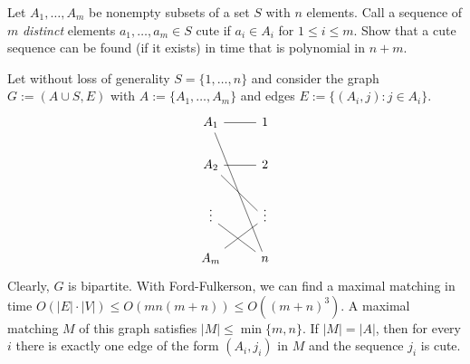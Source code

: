 \documentclass{article}
\begin{document}
\newpage
\begin{exercise}
    Let $A_1,\dots, A_m$ be nonempty subsets of a set $S$ with $n$ elements. Call a sequence of $m$ \textit{distinct} elements $a_1,\dots, a_m\in S$ cute if $a_i\in A_i$ for $1\leq i\leq m$. Show that a cute sequence can be found (if it exists) in time that is polynomial in $n+m$.
\end{exercise}
\begin{solving}
Let without loss of generality $S = \{1, \dots, n\}$ and consider the graph $G:= (A\cup S, E)$ with $A := \{A_1, \dots, A_m\}$ and edges $E:= \{(A_i, j): j\in A_i\}$. \begin{equation*}
    \begin{tikzcd}
        A_1\arrow[r, no head]\arrow[rddd, no head]& 1\\
        A_2\arrow[r, no head]\arrow[rd, no head]& 2 \\
        \vdots\arrow[rd, no head] & \vdots\\
        A_m \arrow[ru, no head] & n
    \end{tikzcd}
\end{equation*}
Clearly, $G$ is bipartite. With Ford-Fulkerson, we can find a maximal matching in time $O(|E|\cdot|V|)\leq O(mn(m+n)) \leq O((m+n)^3)$. A maximal matching $M$ of this graph satisfies $|M|\leq \min\{m,n\}$. If $|M| = |A|$, then for every $i$ there is exactly one edge of the form $(A_i, j_i)$ in $M$ and the sequence $j_i$ is cute.
    
\end{solving}
\end{document}

